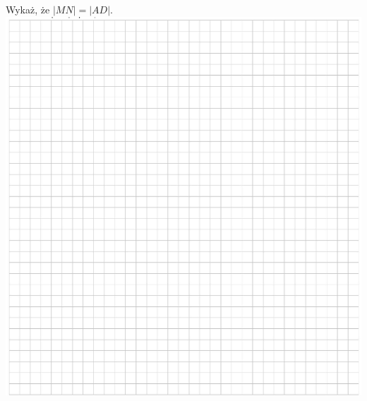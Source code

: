 \documentclass[10pt]{article}
\begin{document}
Wykaż, że \(|M N|=|A D|\).\\
\includegraphics[max width=\textwidth, center]{2024_11_21_054c332d5c02f869c372g-08(1)}\\
\end{document}
